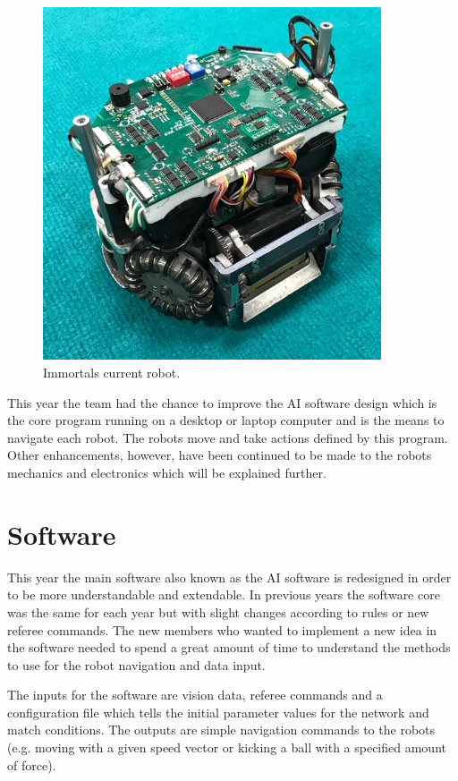 \documentclass[runningheads]{llncs}
\begin{document}
\begin{figure}
\centering
\includegraphics[width=10cm]{images/std_robot.jpeg}
\caption{Immortals current robot.} \label{fig_std_robot}
\end{figure}

This year the team had the chance to improve the AI software design which is the core program running on a desktop or laptop computer and is the means to navigate each robot. The robots move and take actions defined by this program. Other enhancements, however, have been continued to be made to the robots mechanics and electronics which will be explained further.

\section{Software}
This year the main software also known as the AI software is redesigned in order to be more understandable and extendable. In previous years the software core was the same for each year but with slight changes according to rules or new referee commands. The new members who wanted to implement a new idea in the software needed to spend a great amount of time to understand the methods to use for the robot navigation and data input.

The inputs for the software are vision data, referee commands and a configuration file which tells the initial parameter values for the network and match conditions. The outputs are simple navigation commands to the robots (e.g. moving with a given speed vector or kicking a ball with a specified amount of force).
\end{document}
